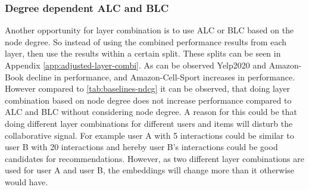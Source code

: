 \subsubsection{Degree dependent ALC and BLC}
Another opportunity for layer combination is to use ALC or BLC based on the node degree.
So instead of using the combined performance results from each layer, then use the results within a certain split.
These splits can be seen in Appendix \autoref{app:adjusted-layer-combi}.
As can be observed Yelp2020 and Amazon-Book decline in performance, and Amazon-Cell-Sport increases in performance.
However compared to \autoref{tab:baselines-ndcg} it can be observed, that doing layer combination based on node degree does not increase performance compared to ALC and BLC without considering node degree.
A reason for this could be that doing different layer combinations for different users and items will disturb the collaborative signal.
For example user A with 5 interactions could be similar to user B with 20 interactions and hereby user B's interactions could be good candidates for recommendations.
However, as two different layer combinations are used for user A and user B, the embeddings will change more than it otherwise would have.
